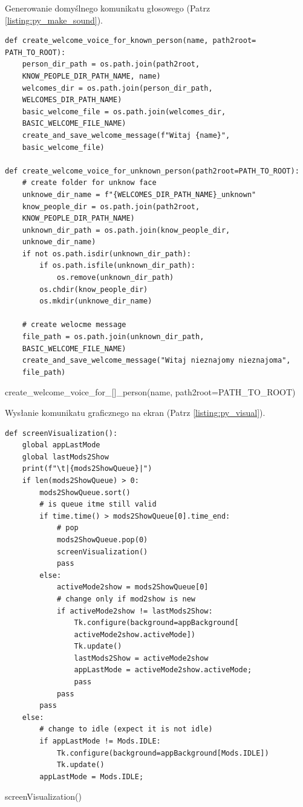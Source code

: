 \documentclass[a4paper,12pt,reqno]{article}
\begin{document}
\newpage
Generowanie domyślnego komunikatu głosowego  (Patrz \ref{listing:py_make_sound}).
\begin{listing}[H]%
\begin{mdframed}[backgroundcolor=codebg]
\begin{verbatim}
def create_welcome_voice_for_known_person(name, path2root=
PATH_TO_ROOT):
    person_dir_path = os.path.join(path2root, 
    KNOW_PEOPLE_DIR_PATH_NAME, name)
    welcomes_dir = os.path.join(person_dir_path, 
    WELCOMES_DIR_PATH_NAME)
    basic_welcome_file = os.path.join(welcomes_dir, 
    BASIC_WELCOME_FILE_NAME)
    create_and_save_welcome_message(f"Witaj {name}", 
    basic_welcome_file)

def create_welcome_voice_for_unknown_person(path2root=PATH_TO_ROOT):
    # create folder for unknow face
    unknowe_dir_name = f"{WELCOMES_DIR_PATH_NAME}_unknown"
    know_people_dir = os.path.join(path2root, 
    KNOW_PEOPLE_DIR_PATH_NAME)
    unknown_dir_path = os.path.join(know_people_dir, 
    unknowe_dir_name)
    if not os.path.isdir(unknown_dir_path):
        if os.path.isfile(unknown_dir_path):
            os.remove(unknown_dir_path)
        os.chdir(know_people_dir)
        os.mkdir(unknowe_dir_name)
    
    # create welocme message
    file_path = os.path.join(unknown_dir_path, 
    BASIC_WELCOME_FILE_NAME)
    create_and_save_welcome_message("Witaj nieznajomy nieznajoma", 
    file_path)
\end{verbatim}
\end{mdframed}
\caption{create\_welcome\_voice\_for\_[]\_person(name, path2root=PATH\_TO\_ROOT)}
\label{listing:py_make_sound}
\end{listing}

\newpage
Wysłanie komunikatu graficznego na ekran (Patrz \ref{listing:py_visual}).
\begin{listing}[H]%
\begin{mdframed}[backgroundcolor=codebg]
\begin{verbatim}
def screenVisualization():
    global appLastMode
    global lastMods2Show
    print(f"\t|{mods2ShowQueue}|")
    if len(mods2ShowQueue) > 0:
        mods2ShowQueue.sort()
        # is queue itme still valid
        if time.time() > mods2ShowQueue[0].time_end:
            # pop
            mods2ShowQueue.pop(0)
            screenVisualization()
            pass
        else:
            activeMode2show = mods2ShowQueue[0]
            # change only if mod2show is new
            if activeMode2show != lastMods2Show:
                Tk.configure(background=appBackground[
                activeMode2show.activeMode])
                Tk.update()
                lastMods2Show = activeMode2show
                appLastMode = activeMode2show.activeMode;
                pass
            pass
        pass
    else:
        # change to idle (expect it is not idle)
        if appLastMode != Mods.IDLE:
            Tk.configure(background=appBackground[Mods.IDLE])
            Tk.update()
        appLastMode = Mods.IDLE;
\end{verbatim}
\end{mdframed}
\caption{screenVisualization()}
\label{listing:py_visual}
\end{listing}
\end{document}
